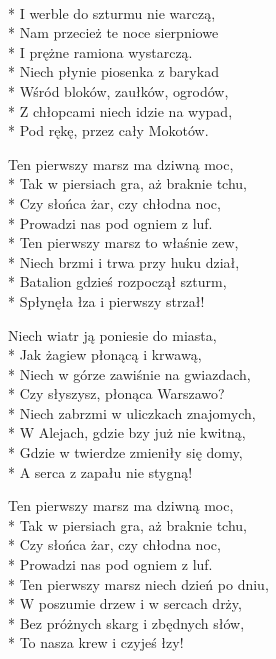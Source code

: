 \begin{lyrics}[longestline={Ten pierwszy marsz niech dzień po dniu,}]

\\*
I werble do szturmu nie warczą,\\*
Nam przecież te noce sierpniowe\\*
I prężne ramiona wystarczą.\\*
Niech płynie piosenka z barykad\\*
Wśród bloków, zaułków, ogrodów,\\*
Z chłopcami niech idzie na wypad,\\*
Pod rękę, przez cały Mokotów.

Ten pierwszy marsz ma dziwną moc,\\*
Tak w piersiach gra, aż braknie tchu,\\*
Czy słońca żar, czy chłodna noc,\\*
Prowadzi nas pod ogniem z luf.\\*
Ten pierwszy marsz to właśnie zew,\\*
Niech brzmi i trwa przy huku dział,\\*
Batalion gdzieś rozpoczął szturm,\\*
Spłynęła łza i pierwszy strzał!

Niech wiatr ją poniesie do miasta,\\*
Jak żagiew płonącą i krwawą,\\*
Niech w górze zawiśnie na gwiazdach,\\*
Czy słyszysz, płonąca Warszawo?\\*
Niech zabrzmi w uliczkach znajomych,\\*
W Alejach, gdzie bzy już nie kwitną,\\*
Gdzie w twierdze zmieniły się domy,\\*
A serca z zapału nie stygną!

Ten pierwszy marsz ma dziwną moc,\\*
Tak w piersiach gra, aż braknie tchu,\\*
Czy słońca żar, czy chłodna noc,\\*
Prowadzi nas pod ogniem z luf.\\*
Ten pierwszy marsz niech dzień po dniu,\\*
W poszumie drzew i w sercach drży,\\*
Bez próżnych skarg i zbędnych słów,\\*
To nasza krew i czyjeś łzy!
\end{lyrics}



